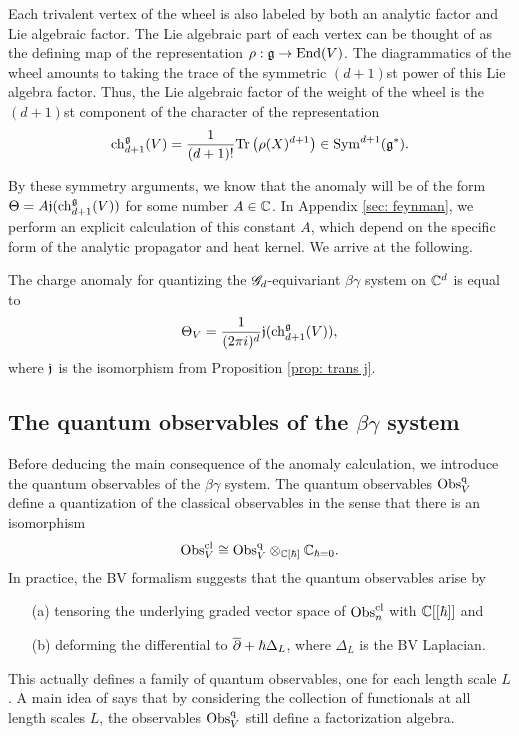 Each trivalent vertex of the wheel is also labeled by both an analytic factor and Lie algebraic factor. 
The Lie algebraic part of each vertex can be thought of as the defining map of the representation $\rho : \mathfrak g \to {\rm End}(V)$. 
The diagrammatics of the wheel amounts to taking the trace of the symmetric $(d+1)$st power of this Lie algebra factor. 
Thus, the Lie algebraic factor of the weight of the wheel is the $(d+1)$st component of the character of the representation
\[
{\rm ch}_{d+1}^\mathfrak g(V) = \frac{1}{(d+1)!} {\rm Tr}\left(\rho(X)^{d+1}\right) \in {\rm Sym}^{d+1}(\mathfrak g^*) .
\]

By these symmetry arguments, we know that the anomaly will be of the form $\Theta = A \mathfrak j ({\rm ch}_{d+1}^{\mathfrak g}(V))$ for some number $A \in \mathbb C$.
In Appendix \ref{sec: feynman}, we perform an explicit calculation of this constant $A$, which depend on the specific form of the analytic propagator and heat kernel. 
We arrive at the following.

\begin{prop}\label{prop: bg anomaly}
The charge anomaly for quantizing the $\mathscr G_d$-equivariant $\beta\gamma$ system on $\mathbb C^d$ is equal to
\[
\Theta_V = \frac{1}{(2\pi i)^d} \mathfrak j ({\rm ch}_{d+1}^{\mathfrak g}(V)),
\]
where $\mathfrak j$ is the isomorphism from Proposition \ref{prop: trans j}.
\end{prop}

\subsection{The quantum observables of the $\beta\gamma$ system}

Before deducing the main consequence of the anomaly calculation, we introduce the quantum observables of the $\beta\gamma$ system. 
The quantum observables ${\rm Obs}^{{\rm q}}_V$ define a quantization of the classical observables in the sense that there is an isomorphism
\[
{\rm Obs}^{{\rm cl}}_V \cong {\rm Obs}^{\rm q}_V \otimes_{\mathbb C[\hbar]} \mathbb C_{\hbar = 0} .
\]
In practice, the BV formalism suggests that the quantum observables arise by 
\begin{enumerate}
\item[(a)] tensoring the underlying graded vector space of ${\rm Obs}^{\rm cl}_n$ with $\mathbb C[[\hbar]]$ and
\item[(b)] deforming the differential to $\overline{\partial} +\hbar \Delta_L$, where $\Delta_L$ is the BV Laplacian.
\end{enumerate}
This actually defines a family of quantum observables, one for each length scale $L$. 
A main idea of \cite{CG2} says that by considering the collection of functionals at all length scales $L$, the observables ${\rm Obs}^{\rm q}_V$ still define a factorization algebra. 

